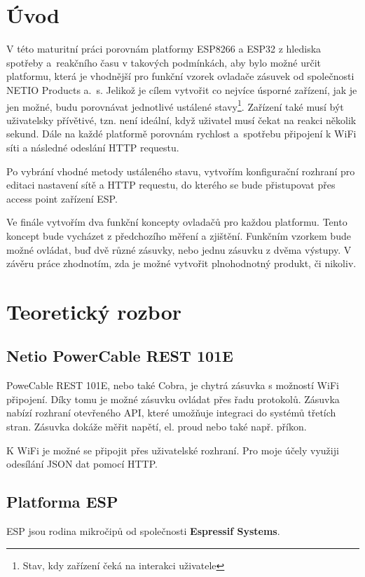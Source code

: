 \documentclass[a4paper, 12pt]{report}
\begin{document}
    \chapter{Úvod}\label{ch:uvod}
    V této maturitní práci porovnám platformy ESP8266 a ESP32 z hlediska spotřeby a~reakčního času v takových podmínkách, aby bylo možné určit platformu, která je vhodnější pro funkční vzorek ovladače zásuvek od společnosti NETIO Products a.~s.
    Jelikož je cílem vytvořit co nejvíce úsporné zařízení, jak je jen možné, budu porovnávat jednotlivé ustálené stavy\footnote{Stav, kdy zařízení čeká na interakci uživatele}.
    Zařízení také musí být uživatelsky přívětivé, tzn. není ideální, když uživatel musí čekat na reakci několik sekund.
    Dále na každé platformě porovnám rychlost a~spotřebu připojení k WiFi síti a následné odeslání HTTP requestu.\par
Po vybrání vhodné metody ustáleného stavu, vytvořím konfigurační rozhraní pro editaci nastavení sítě a HTTP requestu, do kterého se bude přistupovat přes access point zařízení ESP.\par
    Ve finále vytvořím dva funkční koncepty ovladačů pro každou platformu.
    Tento koncept bude vycházet z předchozího měření a zjištění.
    Funkčním vzorkem bude možné ovládat, buď dvě různé zásuvky, nebo jednu zásuvku z dvěma výstupy.
    V závěru práce zhodnotím, zda je možné vytvořit plnohodnotný produkt, či nikoliv.


    \chapter{Teoretický rozbor}\label{ch:teorie}


    \section{Netio PowerCable REST 101E}\label{sec:netio-powercable-rest-101e}

    PoweCable REST 101E, nebo také Cobra, je chytrá zásuvka s možností WiFi připojení.
    Díky tomu je možné zásuvku ovládat přes řadu protokolů.
    Zásuvka nabízí rozhraní otevřeného API, které umožňuje integraci do systémů třetích stran.
    Zásuvka dokáže měřit napětí, el. proud nebo také např. příkon.\par
    K WiFi je možné se připojit přes uživatelské rozhraní.
    Pro moje účely využiji odesílání JSON dat pomocí HTTP\@.


    \section{Platforma ESP}\label{sec:platforma-esp}
    ESP jsou rodina mikročipů od společnosti \textbf{Espressif Systems}.
\end{document}
